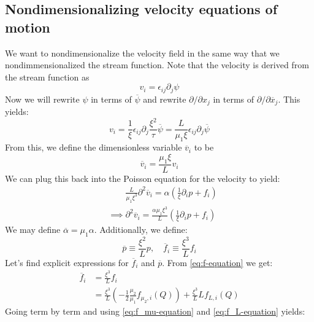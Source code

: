\documentclass[reqno]{article}
\begin{document}
	\subsection{Nondimensionalizing velocity equations of motion}
	We want to nondimensionalize the velocity field in the same way that we nondimmensionalized the stream function.
	Note that the velocity is derived from the stream function as
	\begin{equation}
	v_i = \epsilon_{ij} \partial_j \psi
	\end{equation}
	Now we will rewrite $\psi$ in terms of $\overline{\psi}$ and rewrite $\partial/\partial x_j$ in terms of $\partial/\partial \overline{x}_j$. 
	This yields:
	\begin{equation}
	v_i 
	= \frac{1}{\xi} \epsilon_{ij} \partial_j \frac{\xi^2}{\tau} \overline{\psi}
	= \frac{L}{\mu_1 \xi} \epsilon_{ij} \partial_j \overline{\psi}
	\end{equation}
	From this, we define the dimensionless variable $\overline{v}_i$ to be
	\begin{equation}
	\overline{v}_i = \frac{\mu_1 \xi}{L} v_i
	\end{equation}
	We can plug this back into the Poisson equation for the velocity to yield:
	\begin{equation}
	\begin{split}
	&\qquad\frac{L}{\mu_1 \xi^3} \partial^2 \overline{v}_i
	= \alpha \left(
	\frac{1}{\xi} \partial_i p + f_i
	\right) \\
	&\implies
	\partial^2 \overline{v}_i
	= \frac{\alpha \mu_1 \xi^3}{L} \left(
	\frac{1}{\xi} \partial_i p
	+ f_i
	\right)
	\end{split}
	\end{equation}
	We may define $\overline{\alpha} = \mu_1 \alpha$. 
	Additionally, we define:
	\begin{equation}
	\overline{p} \equiv \frac{\xi^2}{L} p,
	\quad \overline{f}_i \equiv \frac{\xi^3}{L} f_i
	\end{equation}
	Let's find explicit expressions for $\overline{f}_i$ and $\overline{p}$.
	From \eqref{eq:f-equation} we get:
	\begin{equation}
	\begin{split}
	\overline{f}_i 
	&= \frac{\xi^3}{L} f_i \\
	&= \frac{\xi^3}{L} \left( 
	- \frac12 \frac{\mu_2}{\mu_1} f_{\mu_2, i} (Q)
	\right)
	+ \frac{\xi^3}{L} L f_{L, i}(Q)
	\end{split}
	\end{equation}
	Going term by term and using \eqref{eq:f_mu-equation} and \eqref{eq:f_L-equation} yields:
\end{document}
